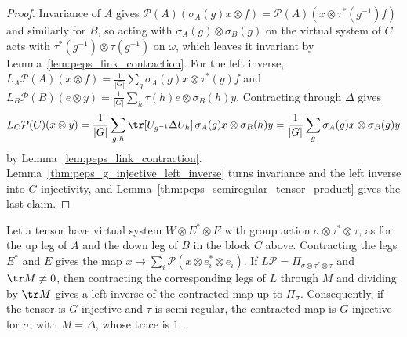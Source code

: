 \begin{proof}\leanok
    Invariance of $A$ gives
    $\mathcal{P}(A)(\sigma_A(g)x\otimes f)=\mathcal{P}(A)(x\otimes\tau^*(g^{-1})f)$
    and similarly for $B$, so acting with $\sigma_A(g)\otimes\sigma_B(g)$ on
    the virtual system of $C$ acts with $\tau^*(g^{-1})\otimes\tau(g^{-1})$
    on $\omega$, which leaves it invariant by
    Lemma~\ref{lem:peps_link_contraction}. For the left inverse,
    $L_A\mathcal{P}(A)(x\otimes f)
        =\frac{1}{|G|}\sum_g\sigma_A(g)x\otimes\tau^*(g)f$ and
    $L_B\mathcal{P}(B)(e\otimes y)
        =\frac{1}{|G|}\sum_h\tau(h)e\otimes\sigma_B(h)y$. Contracting through
    $\Delta$ gives
    \begin{align*}
        L_C\mathcal{P}(C)(x\otimes y)
        =\frac{1}{|G|}\sum_{g,h}\tr[U_{g^{-1}}\Delta U_h]\,
        \sigma_A(g)x\otimes\sigma_B(h)y
        =\frac{1}{|G|}\sum_g\sigma_A(g)x\otimes\sigma_B(g)y
    \end{align*}
    by Lemma~\ref{lem:peps_link_contraction}. Lemma~\ref{thm:peps_g_injective_left_inverse}
    turns invariance and the left inverse into $G$-injectivity, and
    Lemma~\ref{thm:peps_semiregular_tensor_product} gives the last claim.
\end{proof}

\begin{lemma}%
    \label{thm:peps_g_injective_leg_contraction}
    \leanok
    Let a tensor have virtual system $W\otimes E^*\otimes E$ with group action
    $\sigma\otimes\tau^*\otimes\tau$, as for the up leg of $A$ and the down leg
    of $B$ in the block $C$ above. Contracting the legs $E^*$ and $E$ gives
    the map $x\mapsto\sum_i\mathcal{P}(x\otimes e_i^*\otimes e_i)$. If
    $L\mathcal{P}=\Pi_{\sigma\otimes\tau^*\otimes\tau}$ and $\tr M\ne0$, then
    contracting the corresponding legs of $L$ through $M$ and dividing by
    $\tr M$ gives a left inverse of the contracted map up to $\Pi_\sigma$.
    Consequently, if the tensor is $G$-injective and $\tau$ is semi-regular,
    the contracted map is $G$-injective for $\sigma$, with $M=\Delta$, whose
    trace is $1$ \cite[Observation~5.3]{Schuch2010PEPS}.
\end{lemma}

